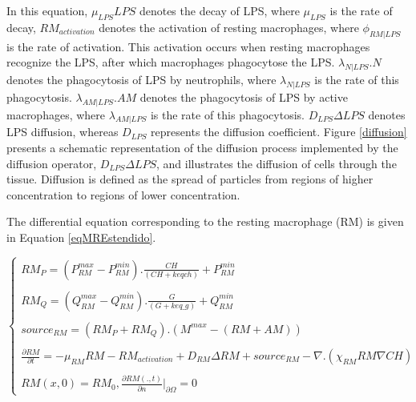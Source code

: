 \documentclass[10pt]{bmc_article}
\newenvironment{bmcformat}{\baselineskip20pt\sloppy\setboolean{publ}{false}}{\baselineskip20pt\sloppy}
\begin{document}
\begin{bmcformat}
In this equation, $\mu_{LPS} LPS$ denotes the decay of LPS, where $\mu_{LPS}$ is the rate of decay, $RM_{activation}$ denotes 
the activation of resting macrophages, where $\phi_{RM|LPS}$ is the rate of activation. This activation occurs when resting macrophages 
recognize the LPS, after which macrophages phagocytose the LPS. $\lambda_{N|LPS}.N$ denotes the phagocytosis of LPS by neutrophils, 
where $\lambda_{N|LPS}$ is the rate of this phagocytosis. $\lambda_{AM|LPS}.AM$ denotes the phagocytosis of LPS by active macrophages, 
where  $\lambda_{AM|LPS}$ is the rate of this phagocytosis. $D_{LPS}\Delta LPS$ denotes LPS diffusion, whereas $D_{LPS}$ represents the 
diffusion coefficient. Figure \ref{diffusion} presents a schematic representation of the diffusion process implemented by the diffusion 
operator, $D_{LPS}\Delta LPS$, and illustrates the diffusion of cells through the tissue. Diffusion is defined as the spread of particles 
from regions of higher concentration to regions of lower concentration. 


The differential equation corresponding to the resting macrophage (RM) is given in Equation \ref{eqMREstendido}.

\begin{equation}
\label{eqMREstendido}
 \begin{cases} 
RM_{P} = (P^{max}_{RM} - P^{min}_{RM}).\frac{CH}{(CH + keqch)} + P^{min}_{RM}\\\\
RM_{Q} = (Q^{max}_{RM} - Q^{min}_{RM}).\frac{G}{(G + keq\_g)} + Q^{min}_{RM}\\\\
source_{RM} = (RM_{P} + RM_{Q}).(M^{max} - (RM + AM))\\  \\
\frac{\partial RM}{\partial t} = -\mu_{RM} RM - RM_{activation} + D_{RM} \Delta RM + source_{RM} - \nabla. (\chi_{RM} RM \nabla CH)  \\\\
RM(x,0) = RM_0, \frac{\partial RM(.,t)}{\partial n} |_{\partial\Omega} = 0
 \end{cases}
\end{equation}


\end{bmcformat}
\end{document}
